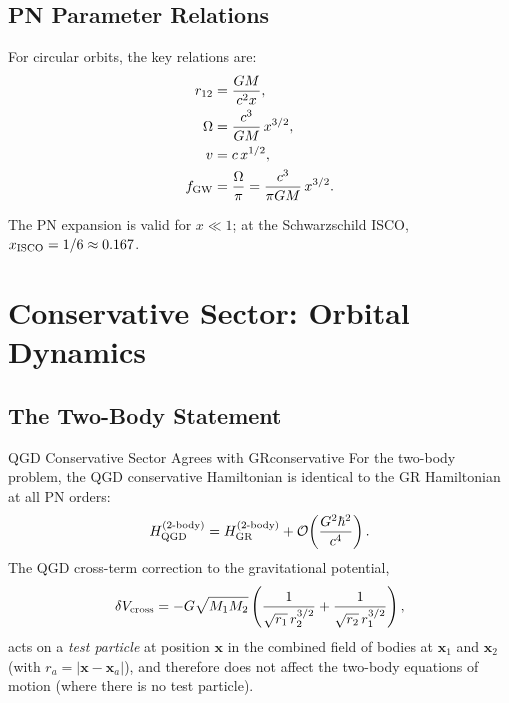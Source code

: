 \documentclass[11pt,a4paper]{article}
\theoremstyle{definition}
\theoremstyle{remark}
\newcommand{\boldx}{\mathbf{x}}
\begin{document}
	\subsection{PN Parameter Relations}
	
	For circular orbits, the key relations are:
	\begin{align}
		r_{12} &= \frac{GM}{c^2 x}, \label{eq:r12_x}\\
		\Omega &= \frac{c^3}{GM}\,x^{3/2}, \label{eq:Omega_x}\\
		v &= c\,x^{1/2}, \label{eq:v_x}\\
		f_{\rm GW} &= \frac{\Omega}{\pi} = \frac{c^3}{\pi GM}\,x^{3/2}. \label{eq:f_x}
	\end{align}
	
	The PN expansion is valid for $x\ll1$; at the Schwarzschild ISCO,
	$x_{\rm ISCO}=1/6\approx0.167$.
	
	\section{Conservative Sector: Orbital Dynamics}
	\label{sec:conservative}
	
	\subsection{The Two-Body Statement}
	
	\begin{theorem}{QGD Conservative Sector Agrees with GR}{conservative}
		For the two-body problem, the QGD conservative Hamiltonian is
		identical to the GR Hamiltonian at all PN orders:
		\begin{equation}
			H_{\rm QGD}^{(2\text{-body})}
			= H_{\rm GR}^{(2\text{-body})}
			+ \mathcal{O}\!\left(\frac{G^2\hbar^2}{c^4}\right).
			\label{eq:H_agree}
		\end{equation}
		The QGD cross-term correction to the gravitational potential,
		\begin{equation}
			\delta V_{\rm cross}
			= -G\sqrt{M_1 M_2}\left(\frac{1}{\sqrt{r_1}\,r_2^{3/2}}
			+ \frac{1}{\sqrt{r_2}\,r_1^{3/2}}\right),
			\label{eq:V_cross}
		\end{equation}
		acts on a \emph{test particle} at position $\boldx$ in the combined
		field of bodies at $\boldx_1$ and $\boldx_2$ (with $r_a=|\boldx-\boldx_a|$),
		and therefore does not affect the two-body equations of motion
		(where there is no test particle).
	\end{theorem}
	
\end{document}
